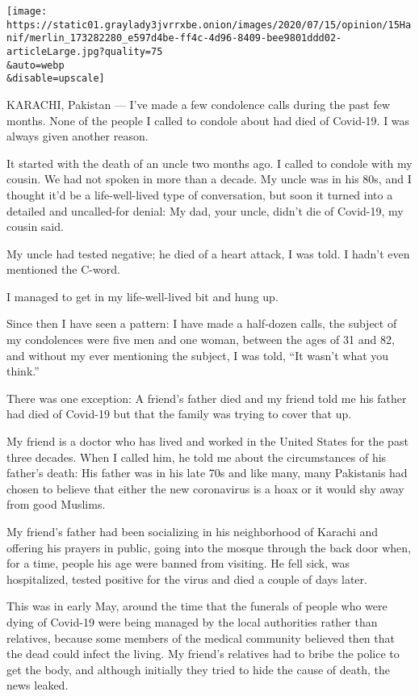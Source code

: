 \texttt{[image: https://static01.graylady3jvrrxbe.onion/images/2020/07/15/opinion/15Hanif/merlin\_173282280\_e597d4be-ff4c-4d96-8409-bee9801ddd02-articleLarge.jpg?quality=75\\\&auto=webp\\\&disable=upscale]}

KARACHI, Pakistan --- I've made a few condolence calls during the past
few months. None of the people I called to condole about had died of
Covid-19. I was always given another reason.

It started with the death of an uncle two months ago. I called to
condole with my cousin. We had not spoken in more than a decade. My
uncle was in his 80s, and I thought it'd be a life-well-lived type of
conversation, but soon it turned into a detailed and uncalled-for
denial: My dad, your uncle, didn't die of Covid-19, my cousin said.

My uncle had tested negative; he died of a heart attack, I was told. I
hadn't even mentioned the C-word.

I managed to get in my life-well-lived bit and hung up.

Since then I have seen a pattern: I have made a half-dozen calls, the
subject of my condolences were five men and one woman, between the ages
of 31 and 82, and without my ever mentioning the subject, I was told,
``It wasn't what you think.''

There was one exception: A friend's father died and my friend told me
his father had died of Covid-19 but that the family was trying to cover
that up.

My friend is a doctor who has lived and worked in the United States for
the past three decades. When I called him, he told me about the
circumstances of his father's death: His father was in his late 70s and
like many, many Pakistanis had chosen to believe that either the new
coronavirus is a hoax or it would shy away from good Muslims.

My friend's father had been socializing in his neighborhood of Karachi
and offering his prayers in public, going into the mosque through the
back door when, for a time, people his age were banned from visiting. He
fell sick, was hospitalized, tested positive for the virus and died a
couple of days later.

This was in early May, around the time that the funerals of people who
were dying of Covid-19 were being managed by the local authorities
rather than relatives, because some members of the medical community
believed then that the dead could infect the living. My friend's
relatives had to bribe the police to get the body, and although
initially they tried to hide the cause of death, the news leaked.

